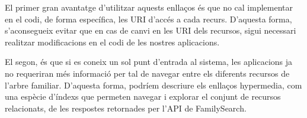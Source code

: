     El primer gran avantatge d’utilitzar aquests enllaços és que no cal implementar en el codi, de forma específica, les URI d'accés a cada recurs. D'aquesta forma, s'aconsegueix evitar que en cas de canvi en les URI dels recursos, sigui necessari realitzar modificacions en el codi de les nostres aplicacions.

    El segon, és que si es coneix un sol punt d’entrada al sistema, les aplicacions ja no requeriran més informació per tal de navegar entre els diferents recursos de l'arbre familiar. D'aquesta forma, podríem descriure els enllaços hypermedia, com una espècie d'índexs que permeten navegar i explorar el conjunt de recursos relacionats, de les respostes retornades per l'API de FamilySearch.
